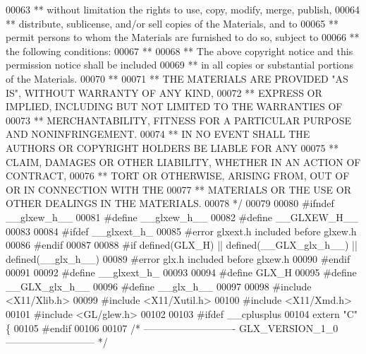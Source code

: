 \begin{DoxyCode}
00063 \textcolor{comment}{** without limitation the rights to use, copy, modify, merge, publish,}
00064 \textcolor{comment}{** distribute, sublicense, and/or sell copies of the Materials, and to}
00065 \textcolor{comment}{** permit persons to whom the Materials are furnished to do so, subject to}
00066 \textcolor{comment}{** the following conditions:}
00067 \textcolor{comment}{** }
00068 \textcolor{comment}{** The above copyright notice and this permission notice shall be included}
00069 \textcolor{comment}{** in all copies or substantial portions of the Materials.}
00070 \textcolor{comment}{** }
00071 \textcolor{comment}{** THE MATERIALS ARE PROVIDED "AS IS", WITHOUT WARRANTY OF ANY KIND,}
00072 \textcolor{comment}{** EXPRESS OR IMPLIED, INCLUDING BUT NOT LIMITED TO THE WARRANTIES OF}
00073 \textcolor{comment}{** MERCHANTABILITY, FITNESS FOR A PARTICULAR PURPOSE AND NONINFRINGEMENT.}
00074 \textcolor{comment}{** IN NO EVENT SHALL THE AUTHORS OR COPYRIGHT HOLDERS BE LIABLE FOR ANY}
00075 \textcolor{comment}{** CLAIM, DAMAGES OR OTHER LIABILITY, WHETHER IN AN ACTION OF CONTRACT,}
00076 \textcolor{comment}{** TORT OR OTHERWISE, ARISING FROM, OUT OF OR IN CONNECTION WITH THE}
00077 \textcolor{comment}{** MATERIALS OR THE USE OR OTHER DEALINGS IN THE MATERIALS.}
00078 \textcolor{comment}{*/}
00079 
00080 \textcolor{preprocessor}{#ifndef \_\_glxew\_h\_\_}
00081 \textcolor{preprocessor}{#define \_\_glxew\_h\_\_}
00082 \textcolor{preprocessor}{#define \_\_GLXEW\_H\_\_}
00083 
00084 \textcolor{preprocessor}{#ifdef \_\_glxext\_h\_}
00085 \textcolor{preprocessor}{#error glxext.h included before glxew.h}
00086 \textcolor{preprocessor}{#endif}
00087 
00088 \textcolor{preprocessor}{#if defined(GLX\_H) || defined(\_\_GLX\_glx\_h\_\_) || defined(\_\_glx\_h\_\_)}
00089 \textcolor{preprocessor}{#error glx.h included before glxew.h}
00090 \textcolor{preprocessor}{#endif}
00091 
00092 \textcolor{preprocessor}{#define \_\_glxext\_h\_}
00093 
00094 \textcolor{preprocessor}{#define GLX\_H}
00095 \textcolor{preprocessor}{#define \_\_GLX\_glx\_h\_\_}
00096 \textcolor{preprocessor}{#define \_\_glx\_h\_\_}
00097 
00098 \textcolor{preprocessor}{#include <X11/Xlib.h>}
00099 \textcolor{preprocessor}{#include <X11/Xutil.h>}
00100 \textcolor{preprocessor}{#include <X11/Xmd.h>}
00101 \textcolor{preprocessor}{#include <GL/glew.h>}
00102 
00103 \textcolor{preprocessor}{#ifdef \_\_cplusplus}
00104 \textcolor{keyword}{extern} \textcolor{stringliteral}{"C"} \{
00105 \textcolor{preprocessor}{#endif}
00106 
00107 \textcolor{comment}{/* ---------------------------- GLX\_VERSION\_1\_0 --------------------------- */}

\end{DoxyCode}
